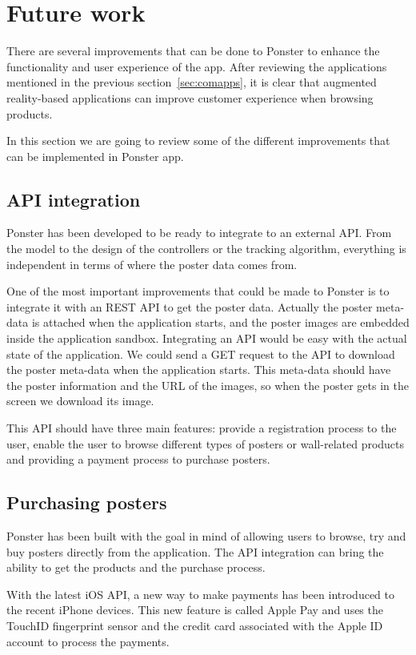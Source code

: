 \section{Future work}
There are several improvements that can be done to Ponster to enhance the
functionality and user experience of the app. After reviewing the applications
mentioned in the previous section~\ref{sec:comapps}, it is clear that augmented
reality-based applications can improve customer experience when browsing products. 

In this section we are going to review some of the different improvements that can
be implemented in Ponster app.

\subsection{API integration}
Ponster has been developed to be ready to integrate to an external API. From the
model to the design of the controllers or the tracking algorithm, everything is
independent in terms of where the poster data comes from. 

One of the most important improvements that could be made to Ponster is to integrate
it with an REST API to get the poster data. Actually the poster meta-data is attached
when the application starts, and the poster images are embedded inside the
application sandbox. Integrating an API would be easy with the actual state of the
application. We could send a GET request to the API to download the poster meta-data
when the application starts. This meta-data should have the poster information and
the URL of the images, so when the poster gets in the screen we download its
image. 

This API should have three main features: provide a registration process to the
user, enable the user to browse different types of posters or wall-related products
and providing a payment process to purchase posters.

\subsection{Purchasing posters}
Ponster has been built with the goal in mind of allowing users to browse, try and
buy posters directly from the application. The API integration can bring the ability
to get the products and the purchase process.

With the latest iOS API, a new way to make payments has been introduced to the
recent iPhone devices. This new feature is called Apple Pay\cite{applepay} and uses
the TouchID fingerprint sensor and the credit card associated with the Apple ID
account to process the payments.

